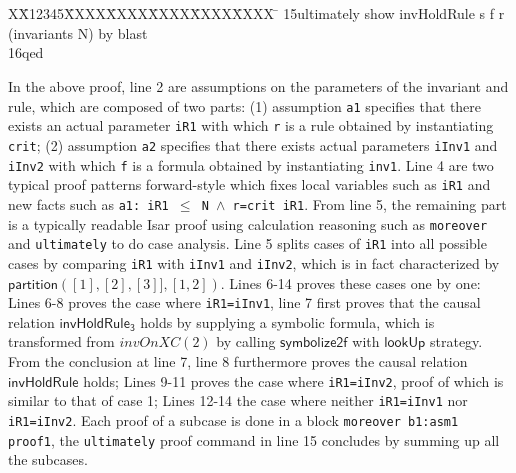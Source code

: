 \documentclass[final]{IEEEtran}
\newlength{\fminilength}
\newenvironment{fmini}[1][\linewidth]
  {\setlength{\fminilength}{#1\fboxsep-2\fboxrule}%
   \vspace{2ex}\noindent\begin{lrbox}{\fminibox}\begin{minipage}{\fminilength}%
   \mbox{ }\hfill\vspace{-2.5ex}}%
  {\end{minipage}\end{lrbox}\vspace{1ex}\hspace{0ex}%
   \framebox{\usebox{\fminibox}}}
\newenvironment{specification}
{\noindent\scriptsize
\tt\begin{fmini}\begin{tabbing}X\=X12345\=XXXX\=XXXX\=XXXX\=XXXX\=XXXX
\=\+\kill} {\end{tabbing}\normalfont\end{fmini}}
\def \iInv {iInv}
\def \iR {iR}
\begin{document}
{\begin{specification}
15ultimately show invHoldRule s f r
(invariants N) by blast\\
16qed\\
\end{specification}

In the above proof, line 2 are assumptions on the parameters of the invariant and rule, which are composed of two parts: (1) assumption {\tt a1} specifies that there exists an actual parameter {\tt \iR1} with which {\tt r} is a rule obtained by instantiating {\tt crit}; (2) assumption {\tt a2} specifies that  there exists   actual parameters {\tt \iInv1} and {\tt \iInv2} with which {\tt f} is a formula obtained by instantiating {\tt inv1}.
Line 4 are two typical  proof patterns forward-style which fixes local variables such as {\tt \iR1} and new facts such as {\tt a1: iR1 $\le$ N $\wedge$ r=crit \iR1}. From line 5, the remaining part  is a typically readable Isar proof using calculation
reasoning such as {\tt moreover} and {\tt ultimately} to do  case analysis.
Line 5 splits cases of {\tt iR1} into all possible cases by comparing
{\tt \iR1} with {\tt \iInv1} and {\tt \iInv2}, which is in fact characterized by $\mathsf{partition}([1],[2],[3]],[1,2])$. Lines 6-14  proves    these cases one by one: Lines 6-8 proves the case where {\tt iR1=\iInv1}, line 7 first proves that the causal relation $\mathsf{invHoldRule_3}$ holds by supplying a symbolic formula, which is transformed from $invOnXC(2)$  by calling $\mathsf{symbolize2f}$ with $\mathsf{lookUp}$ strategy.  %
From the conclusion at line 7, line 8 furthermore proves the causal relation $\mathsf{invHoldRule}$  holds; Lines 9-11 proves the case where {\tt iR1=\iInv2}, proof of which is similar to that of case 1; Lines 12-14 the case   where neither {\tt iR1=\iInv1} nor {\tt iR1=\iInv2}. Each proof of a subcase is done in a block {\tt moreover b1:asm1 proof1}, the {\tt ultimately}  proof command in line 15 concludes by summing up all the subcases.



}
\end{document}
